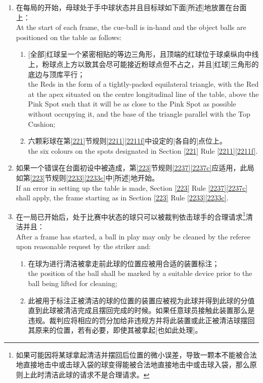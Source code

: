 \begin{enumerate}[label=(\alph*)]
    \item 在每局的开始，母球处于手中球状态并且目标球如下面[所述]地放置在台面上：\\
    At the start of each frame, the cue-ball is in-hand and the object balls are positioned on the table as follows:
    \begin{enumerate}[label=(\roman*)]
        \item ${}$[全部]红球呈一个紧密相贴的等边三角形，且顶端的红球位于球桌纵向中线上，粉球点上方以致其会尽可能接近粉球点但不占之，并且[红球]三角形的底边与顶库平行；\\
        the Reds in the form of a tightly-packed equilateral triangle, with the Red at the apex situated on the centre longitudinal line of the table, above the Pink Spot such that it will be as close to the Pink Spot as possible without occupying it, and the base of the triangle parallel with the Top Cushion;
        \item 六颗彩球在第\ref{221}节规则\ref{2211}\ref{2211f}中设定的[各自的]点位上。\\
        the six colours on the spots designated in Section \ref{221} Rule \ref{2211}\ref{2211f}.
    \end{enumerate}
    \item 如果一个错误在台面初设中被造成，第\ref{223}节规则\ref{2237}\ref{2237c}应适用，此局如第\ref{223}节规则\ref{2233}\ref{2233c}中[所述]地开始。\\
    If an error in setting up the table is made, Section \ref{223} Rule \ref{2237}\ref{2237c} shall apply, the frame starting as in Section \ref{223} Rule \ref{2233}\ref{2233c}.
    \item \label{2232c}在一局已开始后，处于比赛中状态的球只可以被裁判依击球手的合理请求\footnote{如果可能因将某球拿起清洁并摆回后位置的微小误差，导致一颗本不能被合法地直接地击中或击球入袋的球变得能被合法地直接地击中或击球入袋，那么原则上此时清洁此球的请求不是合理请求。}清洁并且：\\
    After a frame has started, a ball in play may only be cleaned by the referee upon reasonable request by the striker and:
    \begin{enumerate}[label=(\roman*)]
        \item 在球为进行清洁被拿走前此球的位置应被用合适的装置标注；\\
        the position of the ball shall be marked by a suitable device prior to the ball being lifted for cleaning;
        \item \label{2232cii}此被用于标注正被清洁的球的位置的装置应被视为此球并得到此球的分值直到此球被清洁完成且摆回完成的时候。如果任意球员接触此装置那么是违规。裁判应将相应的罚分加给非违规方并将此装置或此正被清洁球摆回其原来的位置，若有必要，即使其被拿起[也如此处理]。\\

\end{enumerate}
\end{enumerate}
